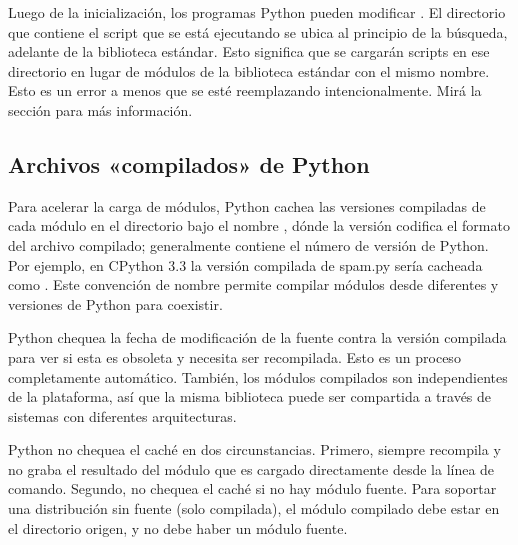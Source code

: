 \documentclass[a5paper,10pt,spanish]{sphinxmanual}
\begin{document}
\sphinxAtStartPar
Luego de la inicialización, los programas Python pueden modificar . El directorio que contiene el script que se está ejecutando se ubica al principio de la búsqueda, adelante de la biblioteca estándar. Esto significa que se cargarán scripts en ese directorio en lugar de módulos de la biblioteca estándar con el mismo nombre. Esto es un error a menos que se esté reemplazando intencionalmente. Mirá la sección {\hyperref[\detokenize{tutorial/modules:tut-standardmodules}]{}} para más información.


\subsection{Archivos «compilados» de Python}
\label{\detokenize{tutorial/modules:compiled-python-files}}
\sphinxAtStartPar
Para acelerar la carga de módulos, Python cachea las versiones compiladas de cada módulo en el directorio  bajo el nombre , dónde la versión codifica el formato del archivo compilado; generalmente contiene el número de versión de Python. Por ejemplo, en CPython  3.3 la versión compilada de spam.py sería cacheada como . Este convención de nombre permite compilar módulos desde diferentes  y versiones de Python para coexistir.

\sphinxAtStartPar
Python chequea la fecha de modificación de la fuente contra la versión compilada para ver si esta es obsoleta y necesita ser recompilada. Esto es un proceso completamente automático. También, los módulos compilados son independientes de la plataforma, así que la misma biblioteca puede ser compartida a través de sistemas con diferentes arquitecturas.

\sphinxAtStartPar
Python no chequea el caché en dos circunstancias. Primero, siempre recompila y no graba el resultado del módulo que es cargado directamente desde la línea de comando. Segundo, no chequea el caché si no hay módulo fuente. Para soportar una distribución sin fuente (solo compilada), el módulo compilado debe estar en el directorio origen, y no debe haber un módulo fuente.
\end{document}
